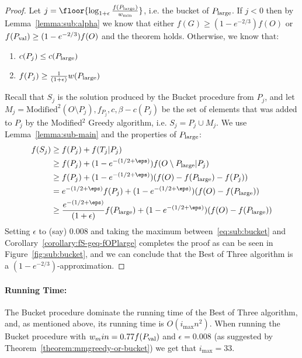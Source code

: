 \begin{proof}
	Let $j = \floor{\log_{1 + \epsilon}\frac{f(\pLarge)}{w_{\min}}}$, i.e. the bucket of $P_{\text{large}}$.
	If $j < 0$ then by Lemma~\ref{lemma:sub:alpha} we know that either $f(G) \geq (1 - e^{-2/3})f(O)$ or $f(P_{\text{val}}) \geq (1 - e^{-2/3})f(O)$ and the theorem holds.
	Otherwise, we know that:
	\begin{enumerate}
		\item $c(P_j) \leq c(P_{\text{large}})$
		\item $f(P_j) \geq \frac{1}{(1 + \epsilon)}w(P_{\text{large}})$
	\end{enumerate}
	Recall that $S_{j}$ is the solution produced by the Bucket procedure from $P_j$, and let $M_j = \text{Modified}^2(O \setminus P_j), f_{P_j}, c, \beta - c(P_j)$ be the set of elements that was added to $P_j$ by the Modified$^2$ Greedy algorithm, i.e. $S_j = P_j \cup M_j$.
	We use Lemma~\ref{lemma:sub-main} and the properties of $P_{\text{large}}$:
	\begin{align}
		f(S_{j}) 
		&
		\geq f(P_j) + f(T_j|P_j)
		\\ & 
		\geq f(P_j) + (1-e^{-(1/2 + \eps)})f(O \setminus \pLarge | P_j)
		\\ & 
		\geq f(P_j) + (1-e^{-(1/2 + \eps)})(f(O) - f(\pLarge) - f(P_j))
		\\ & 
		= e^{-(1/2 + \eps)}f(P_j) + (1-e^{-(1/2 + \eps)})(f(O) - f(\pLarge))
		\\ & 
		\geq \frac{e^{-(1/2 + \eps)}}{(1 + \epsilon)}f(\pLarge) + (1-e^{-(1/2 + \eps)})(f(O) - f(\pLarge))
		\label{eq:sub:bucket}
	\end{align}
	Setting $\epsilon$ to (say) $0.008$ and taking the maximum between~\ref{eq:sub:bucket} and Corollary~\ref{corollary:fS-geq-fOPlarge} completes the proof as can be seen in Figure~\ref{fig:sub:bucket}, and we can conclude that the Best of Three algorithm is a $(1 - e^{-2/3})$-approximation.
\end{proof}


\paragraph{Running Time:}
The Bucket procedure dominate the running time of the Best of Three algorithm, and, as mentioned above, its running time is $O(i_{\max}n^2)$.
When running the Bucket procedure with $w_min = 0.77f(P_{\text{val}})$ and $\epsilon = 0.008$ (as suggested by Theorem~\ref{theorem:mmgreedy-or-bucket}) we get that $i_{\max} = 33$.

